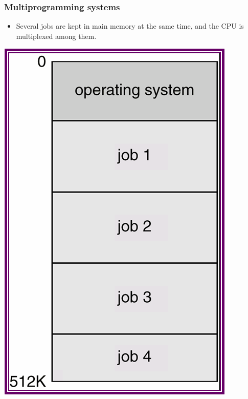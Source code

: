 \documentclass[CJKutf8,xcolor=pdftex,dvipsnames,table]{beamer}
\begin{document}
\begin{CJK*}{UTF8}{song}
  \begin{frame}
    \frametitle{Multiprogramming systems} \pause
	  \begin{itemize}
	  \item{Several jobs are kept in main memory at the same time, and the CPU is multiplexed among them.} \pause
	  \end{itemize}
	  \begin{center}
	    \includegraphics[scale=0.5]{v6f1-3}
	  \end{center}
  \end{frame}


\end{CJK*}
\end{document}
